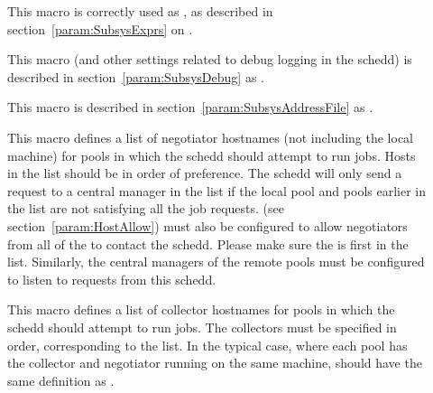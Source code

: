\begin{description}
\item[] \label{param:ScheddExprs} This macro is
  correctly used as , as described in
  section~\ref{param:SubsysExprs} on .

\item[] \label{param:ScheddDebug} This macro
  (and other settings related to debug logging in the schedd) is
  described in section~\ref{param:SubsysDebug} as
  .

\item[] \label{param:ScheddAddressFile}
  This macro is described in
  section~\ref{param:SubsysAddressFile} as
  . 

\item[] \label{param:FlockNegotiatorHosts} 
  This macro defines a list of negotiator hostnames (not including the
  local  machine) for pools in which the
  schedd should attempt to run jobs.  Hosts in the list should be in
  order of preference.  The schedd will only send a request to a
  central manager in the list if the local pool and pools earlier in
  the list are not satisfying all the job requests.
   (see
  section~\ref{param:HostAllow}) must also be configured to allow
  negotiators from all of the  to
  contact the schedd.  Please make sure the
   is first in the
   list.  Similarly, the
  central managers of the remote pools must be configured to listen to
  requests from this schedd.

\item[] \label{param:FLockCollectorHosts}
  This macro defines a list of collector hostnames for pools in which
  the schedd should attempt to run jobs.  The
  collectors must be specified in order, corresponding to the
   list.  In the typical case, where each pool
  has the collector and negotiator running on the same machine,
   should have the same definition as
  .



\end{description}
